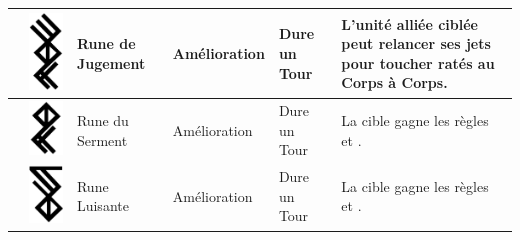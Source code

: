 \begin{tabular}{@{}c@{}c@{\hskip 8pt}>{\raggedright}m{3.3cm}M{2.1cm}M{2.1cm}m{7.4cm}@{}}
\Z{} & \includegraphics[valign=m, width=\runewidth]{pics/battlerune_reckoning.png} &
Rune de Jugement &
Amélioration &
Dure un Tour &
L'unité alliée ciblée peut relancer ses jets pour toucher ratés au Corps à Corps.
\tabularnewline\hline

\Z{} & \includegraphics[valign=m, width=\runewidth]{pics/battlerune_oaths.png} &
Rune du Serment &
Amélioration &
Dure un Tour &
La cible gagne les règles \stubborn{} et \immunetopsychology{}.
\tabularnewline\hline

\Z{} & \includegraphics[valign=m, width=\runewidth]{pics/battlerune_gleaming.png} &
Rune Luisante &
Amélioration &
Dure un Tour &
La cible gagne les règles \hardtarget{} et \distracting{}.
\tabularnewline\hline


\end{tabular}
